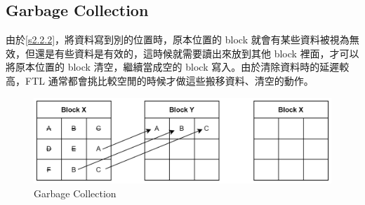 \subsection{Garbage Collection}\label{s2.2.3}
\indent
由於\ref{s2.2.2}，將資料寫到別的位置時，原本位置的 block 就會有某些資料被視為無效，但還是有些資料是有效的，這時候就需要讀出來放到其他 block 裡面，才可以將原本位置的 block 清空，繼續當成空的 block 寫入。由於清除資料時的延遲較高，FTL 通常都會挑比較空閒的時候才做這些搬移資料、清空的動作。
\begin{figure}[H]
    \centering
    \includegraphics[width=1\textwidth]{picture/ch2/garbage_collection.png}
    \caption{Garbage Collection\cite{Garbage_Collection}}
    \label{f2.7}
\end{figure}

